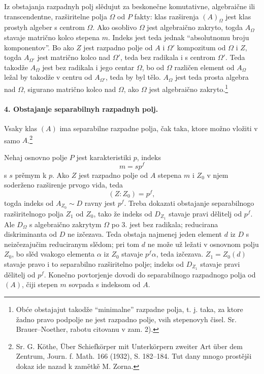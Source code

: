 \documentclass[11pt]{article}
\newcommand{\foreign}[1]{#1}
\providecommand{\glqq}{``}
\providecommand{\grqq}{''}
\begin{document}
Iz obstajanja razpadnyh polj slědujut za beskonečne komutativne, algebraične ili transcendentne, razširitelne polja \(\Omega\) od \(P\) fakty: klas razširenja \((A)_\Omega\) jest klas prostyh algeber s centrom \(\Omega\). Ako osoblivo \(\Omega\) jest algebraično zakryto, togda \(A_\Omega\) stavaje matrično kolco stepena \(m\). Indeks jest teda jednak ``absolutnomu broju komponentov''. Bo ako \(Z\) jest razpadno polje od \(A\) i \(\Omega'\) kompozitum od \(\Omega\) i \(Z\), togda \(A_{\Omega'}\) jest matrično kolco nad \(\Omega'\), teda bez radikala i s centrom \(\Omega'\). Teda takodže \(A_\Omega\) jest bez radikala i jego centar \(\Omega\), bo od \(\Omega\) različen element od \(A_\Omega\) ležal by takodže v centru od \(A_{\Omega'}\), teda by byl tělo. \(A_\Omega\) jest teda prosta algebra nad \(\Omega\), sigurano matrično kolco nad \(\Omega\), ako \(\Omega\) jest algebraično zakryto.\footnote{Obće obstajajut takodže \glqq{}minimalne\grqq{} razpadne polja, t. j. taka, za ktore žadno pravo podpolje ne jest razpadno polje, vsih stepenovyh čisel. Sr. Brauer--Noether, rabotu citovanu v zam. 2).}

\paragraph{4. Obstajanje separabilnyh razpadnyh polj.}
Vsaky klas \((A)\) ima separabilne razpadne polja, čak taka, ktore možno vložiti v samo \(A\).\footnote{Sr. G. Köthe, \foreign{Über Schiefkörper mit Unterkörpern zweiter Art über dem Zentrum}, Journ. f. Math. 166 (1932), S. 182--184. Tut dany mnogo prostějši dokaz ide nazad k zamětkě M. Zorna.}

Nehaj osnovno polje \(P\) jest karakteristiki \(p\), indeks
\[
        m=s p^f
\]
s \(s\) prěmym k \(p\). Ako \(Z\) jest razpadno polje od \(A\) stepena \(m\) i \(Z_0\) v njem soderženo razširenje prvogo vida, teda
\[
        (Z:Z_0)=p^f,
\]
togda indeks od \(A_{Z_0}\sim D\) ravny jest \(p^f\). Treba dokazati obstajanje separabilnogo razširitelnogo polja \(Z_1\) od \(Z_0\), tako že indeks od \(D_{Z_1}\) stavaje pravi dělitelj od \(p^f\). Ale \(D_\Omega\) s algebraično zakrytym \(\Omega\) po 3. jest bez radikala; reducirana diskriminanta od \(D\) ne izčezava. Teda obstaja najmenej jeden element \(d\) iz \(D\) s neizčezajučim reduciranym slědom; pri tom \(d\) ne može už ležati v osnovnom polju \(Z_0\), bo slěd vsakogo elementa \(\alpha\) iz \(Z_0\) stavaje \(p^f\alpha\), teda izčezava. \(Z_1=Z_0(d)\) stavaje pravo i to separabilno razširitelno polje; indeks od \(D_{Z_1}\) stavaje pravi dělitelj od \(p^f\). Konečno povtorjenje dovodi do separabilnogo razpadnogo polja od \((A)\), čiji stepen \(m\) sovpada s indeksom od \(A\).
\end{document}

